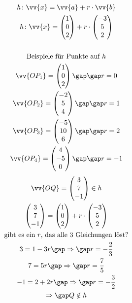 \begin{gather*}
  h \colon \vv{x} = \vv{a} + r \cdot \vv{b} \\
  h \colon \vv{x} = \begin{pmatrix}1 \\ 0 \\ 2\end{pmatrix} + r \cdot \begin{pmatrix}-3 \\ 5 \\ 2\end{pmatrix} \\\\
  \text{Beispiele für Punkte auf $h$} \\
  \vv{OP_1} = \begin{pmatrix}1 \\ 0 \\ 2\end{pmatrix} \gap\gap r = 0 \\
  \vv{OP_2} = \begin{pmatrix}-2 \\ 5 \\ 4\end{pmatrix} \gap\gap r = 1 \\
  \vv{OP_3} = \begin{pmatrix}-5 \\ 10 \\ 6\end{pmatrix} \gap\gap r = 2 \\
  \vv{OP_4} = \begin{pmatrix}4 \\ -5 \\ 0\end{pmatrix} \gap\gap r = -1
\end{gather*}
\begin{gather*}
  \vv{OQ} = \begin{pmatrix}3 \\ 7 \\ -1\end{pmatrix} \in h \\
  \begin{pmatrix}3 \\ 7 \\ -1\end{pmatrix} = \begin{pmatrix}1 \\ 0 \\ 2\end{pmatrix} + r \cdot \begin{pmatrix}-3 \\ 5 \\ 2\end{pmatrix} \\
  \text{gibt es ein $r$, das alle 3 Gleichungen löst?} \\
  3 = 1 - 3r \gap\Rightarrow\gap r = -\frac{2}{3} \\
  7 = 5r \gap\Rightarrow\gap r = \frac{7}{5} \\
  -1 = 2 + 2r \gap\Rightarrow\gap r = -\frac{3}{2} \\
  \Rightarrow\gap Q \notin h
\end{gather*}
